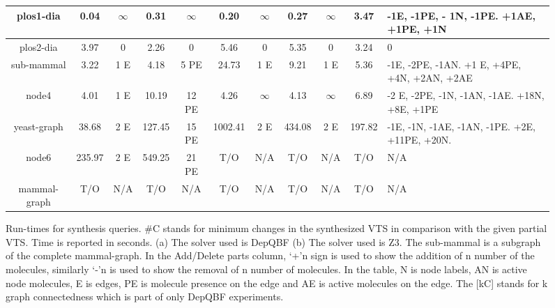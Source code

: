 \begin{sidewaysfigure}[t]
\begin{tabular}[t]{|c@{}|@{}c@{}|@{}c@{}|@{}c@{}|@{}c@{}|@{}c@{}|@{}c@{}|@{}c@{}|@{}c@{}|@{}c@{}|@{}C{4cm}@{}|}
		plos1-dia & 0.04&$\infty$& 0.31 &$\infty$& 0.20 & $\infty$ & 0.27&$\infty$& 3.47 & -1E, -1PE, - 1N, -1PE. +1AE, +1PE, +1N\\\hline
		plos2-dia & 3.97 & 0 &  2.26 & 0  & 5.46 & 0 & 5.35 & 0 & 3.24 & 0 \\\hline
		sub-mammal & 3.22 & 1 E  & 4.18 & 5 PE  & 24.73 & 1 E  & 9.21 & 1 E & 5.36  & -1E, -2PE, -1AN. +1 E, +4PE, +4N, +2AN, +2AE \\\hline
		node4  & 4.01  & 1 E  & 10.19  & 12 PE & 4.26  & $\infty$ & 4.13 &$\infty$&  6.89  & -2 E, -2PE, -1N, -1AN, -1AE. +18N, +8E, +1PE \\\hline
		yeast-graph & 38.68  & 2 E  &   127.45  & 15 PE   & 1002.41  & 2 E  & 434.08   & 2 E & 197.82  &  -1E, -1N, -1AE, -1AN, -1PE. +2E, +11PE, +20N. \\\hline
		node6  &  235.97  & 2 E  &  549.25    & 21 PE    &  T/O  & N/A      &  T/O   &  N/A   &  T/O     & N/A \\\hline
		mammal-graph   &  T/O     & N/A  &  T/O    & N/A    &  T/O  & N/A      &  T/O   &  N/A   &  T/O     & N/A\\\hline
	\end{tabular}
	\caption{Run-times for synthesis queries. \#C stands for minimum changes in the synthesized VTS in comparison with the given partial VTS. Time is reported in seconds. (a) The solver used is DepQBF (b) The solver used is Z3. The sub-mammal is a subgraph of the complete mammal-graph. In the Add/Delete parts column, ‘+’n sign is used to show the addition of n number of the molecules, similarly ‘-’n is used to show the removal of n number of molecules. In the table, N is node labels, AN is active node molecules, E is edges, PE is molecule presence on the edge and AE is active molecules on the edge. The [kC] stands for k graph connectedness which is part of only DepQBF experiments.}
	
	\label{tab:synth-graph}
\end{sidewaysfigure}
